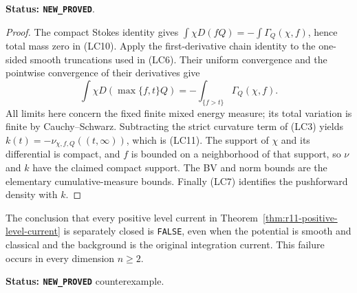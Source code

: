 \noindent\textbf{Status: \texttt{NEW\_PROVED}}.

\begin{proof}
The compact Stokes identity gives
$\int\chi D(fQ)=-\int\Gamma_Q(\chi,f)$, hence total mass
zero in (LC10).  Apply the first-derivative chain identity to the
one-sided smooth truncations used in (LC6).  Their uniform
convergence and the pointwise convergence of their derivatives
give
\[
 \int\chi D(\max\{f,t\}Q)
       =-\int_{\{f>t\}}\Gamma_Q(\chi,f).
\]
All limits here concern the fixed finite mixed energy measure;
its total variation is finite by Cauchy--Schwarz.  Subtracting
the strict curvature term of (LC3) yields
$k(t)=-\nu_{\chi,f,Q}((t,\infty))$, which is (LC11).
The support of $\chi$ and its differential is compact, and
$f$ is bounded on a neighborhood of that support, so $\nu$
and $k$ have the claimed compact support.  The BV and norm
bounds are the elementary cumulative-measure bounds.  Finally
(LC7) identifies the pushforward density with $k$.
\end{proof}

\begin{proposition}
\label{prop:r11-nonclosed-level-example}
The conclusion that every positive level current in
Theorem~\ref{thm:r11-positive-level-current} is separately closed is
\texttt{FALSE}, even when the potential is smooth and classical and
the background is the original integration current.  This failure
occurs in every dimension $n\geq2$.
\end{proposition}

\noindent\textbf{Status: \texttt{NEW\_PROVED}} counterexample.

